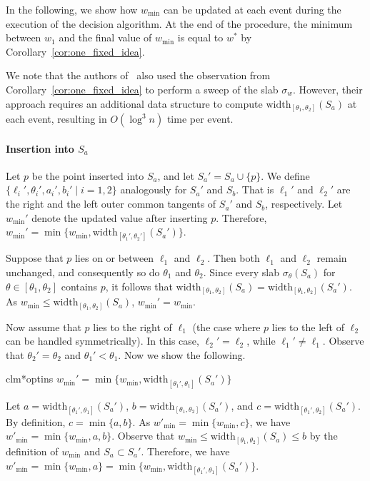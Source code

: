\documentclass[english,a4paper, cleveref, autoref, thm-restate, nolineno]{socg-lipics-v2021}
\theoremstyle{star}
\theoremstyle{claimstar}
\newcommand{\width}{\ensuremath{\mathrm{width}}}
\begin{document}
In the following, we show how $w_{\min}$ can be updated at each event during the execution of the decision algorithm.
At the end of the procedure, the minimum between $w_1$ and the final value of $w_{\min}$ is equal to $w^*$ by Corollary~\ref{cor:one_fixed_idea}. 



We note that the authors of~\cite{ahn2024constrained} also used the observation from Corollary~\ref{cor:one_fixed_idea} to perform a sweep of the slab $\sigma_w$.
However, their approach requires an additional data structure to compute $\width_{[\theta_1, \theta_2]}(S_a)$ at each event, resulting in $O(\log^3 n)$ time per event.


\paragraph*{Insertion into $S_a$}
Let $p$ be the point inserted into $S_a$, and let $S_a' = S_a \cup \{p\}$.
We define $\{\ell_i', \theta_i', a_i', b_i' \mid i=1, 2 \}$ analogously for $S_a'$ and $S_b$. 
That is $\ell_1'$ and $\ell_2'$ are the right and the left outer common tangents of $S_a'$ and $S_b$, respectively. 
Let $w_{\min}'$ denote the updated value after inserting $p$.
Therefore, $w_{\min}' = \min \{w_{\min}, \width_{[\theta_1', \theta_2']}(S_a')\}$.


Suppose that $p$ lies on or between $\ell_1$ and $\ell_2$. 
Then both $\ell_1$ and $\ell_2$ remain unchanged, and consequently so do $\theta_1$ and $\theta_2$.
Since every slab $\sigma_\theta(S_a)$ for $\theta \in [\theta_1, \theta_2]$ contains $p$, it follows that $\width_{[\theta_1, \theta_2]}(S_a) = \width_{[\theta_1, \theta_2]}(S_a')$. 
As $w_{\min} \le \width_{[\theta_1, \theta_2]}(S_a)$, $w_{\min}' = w_{\min}$. 

Now assume that $p$ lies to the right of $\ell_1$ (the case where $p$ lies to the left of $\ell_2$ can be handled symmetrically).
In this case, $\ell_2' = \ell_2$, while $\ell_1' \neq \ell_1$.
Observe that $\theta_2' = \theta_2$ and $\theta_1' < \theta_1$.
Now we show the following. 

\begin{restatable}{clm*}{optins}
    \label{claim:opt_ins}
    $w_{\min}' = \min \{w_{\min}, \width_{[\theta_1', \theta_1]}(S_a') \}$
\end{restatable}



\begin{claimproof}
    Let $a = \width_{[\theta_1', \theta_1]}(S_a')$, 
    $b = \width_{[\theta_1, \theta_2]}(S_a')$, and
    $c = \width_{[\theta_1', \theta_2]}(S_a')$. 
    By definition, $c = \min \{ a, b\}$. 
    As $w'_{\min} = \min \{w_{\min}, c \}$, 
    we have $w'_{\min} = \min \{w_{\min}, a, b \}$. 
    Observe that $w_{\min} \le  \width_{[\theta_1, \theta_2]}(S_a) \le b$ by the definition of $w_{\min}$ and $S_a \subset S_a'$. 
    Therefore, we have $w'_{\min} = \min \{w_{\min}, a \} =  \min \{w_{\min}, \width_{[\theta_1', \theta_1]}(S_a')\}$.
\end{claimproof}
\end{document}
